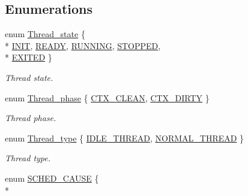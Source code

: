 \subsection*{Enumerations}
\begin{DoxyCompactItemize}
\item 
enum \hyperlink{group__scheduler_ga6c969c169777f82c104cf73e501df70f}{Thread\+\_\+state} \{ \\*
\hyperlink{group__scheduler_gga6c969c169777f82c104cf73e501df70fa0cb1b2c6a7db1f1084886c98909a3f36}{I\+N\+IT}, 
\hyperlink{group__scheduler_gga6c969c169777f82c104cf73e501df70fa6564f2f3e15be06b670547bbcaaf0798}{R\+E\+A\+DY}, 
\hyperlink{group__scheduler_gga6c969c169777f82c104cf73e501df70fa1061be6c3fb88d32829cba6f6b2be304}{R\+U\+N\+N\+I\+NG}, 
\hyperlink{group__scheduler_gga6c969c169777f82c104cf73e501df70fa948b2aee15f52b421fa4770c47bcfe8c}{S\+T\+O\+P\+P\+ED}, 
\\*
\hyperlink{group__scheduler_gga6c969c169777f82c104cf73e501df70fab9f9543350f6bd6191e52158daa88884}{E\+X\+I\+T\+ED}
 \}\begin{DoxyCompactList}\small\item\em Thread state. \end{DoxyCompactList}
\item 
enum \hyperlink{group__scheduler_gab180b4aa356776bddcd724cef4f5deae}{Thread\+\_\+phase} \{ \hyperlink{group__scheduler_ggab180b4aa356776bddcd724cef4f5deaeaa826daca588e692c88114586b0de472b}{C\+T\+X\+\_\+\+C\+L\+E\+AN}, 
\hyperlink{group__scheduler_ggab180b4aa356776bddcd724cef4f5deaea2b4b41fda67c1a83e6523675515c007b}{C\+T\+X\+\_\+\+D\+I\+R\+TY}
 \}\begin{DoxyCompactList}\small\item\em Thread phase. \end{DoxyCompactList}
\item 
enum \hyperlink{group__scheduler_ga18795bc1ab00161fc27ce34b1895fb03}{Thread\+\_\+type} \{ \hyperlink{group__scheduler_gga18795bc1ab00161fc27ce34b1895fb03abc11b4e4eba50c875d7ed6bc34090dd3}{I\+D\+L\+E\+\_\+\+T\+H\+R\+E\+AD}, 
\hyperlink{group__scheduler_gga18795bc1ab00161fc27ce34b1895fb03a1d3bb8be1deb6ac7be94fea88e1ed76b}{N\+O\+R\+M\+A\+L\+\_\+\+T\+H\+R\+E\+AD}
 \}\begin{DoxyCompactList}\small\item\em Thread type. \end{DoxyCompactList}
\item 
enum \hyperlink{group__scheduler_gaad787d8d80312ffca3c0f197b3a25fbe}{S\+C\+H\+E\+D\+\_\+\+C\+A\+U\+SE} \{ \\*

\end{DoxyCompactItemize}
